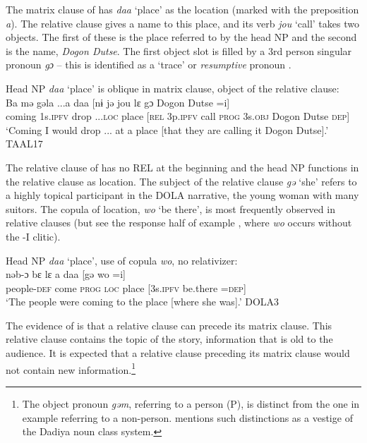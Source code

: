 \documentclass[output=paper]{langscibook}
\begin{document}
\noindent The matrix clause of  has \textit{daa} `place' as the location (marked with the preposition \textit{a}). The relative clause gives a name to this place, and its verb \textit{jou} `call' takes two objects. The first of these is the place referred to by the head NP and the second is the name, \textit{Dogon Dutse}. The first object slot is filled by a 3rd person singular pronoun \textit{gɔ} -- this is identified as a `trace' or \textit{resumptive} pronoun \citep[220]{Andrews2007}.

\ea Head NP \textit{daa} `place' is oblique in matrix clause, object of the relative clause:
\label{ex:dettweiler:TAAL17} \\
\gll Ba mə gəla ...a daa [nɨ jə jou lɛ gɔ Dogon Dutse =i] \\
coming 1s.\textsc{ipfv} drop ...\textsc{loc} place [\textsc{rel} 3p.\textsc{ipfv} call \textsc{prog} 3s.\textsc{obj} Dogon Dutse \textsc{dep}] \\
\glt `Coming I would drop ... at a place [that they are calling it Dogon Dutse].' TAAL17
\z

\noindent The relative clause of  has no REL at the beginning and the head NP functions in the relative clause as location. The subject of the relative clause \textit{gə} `she' refers to a highly topical participant in the DOLA narrative, the young woman with many suitors. The copula of location, \textit{wo} `be there', is most frequently observed in relative clauses (but see the response half of example , where \textit{wo} occurs without the -I clitic).\largerpage

\ea Head NP \textit{daa} `place', use of copula \textit{wo}, no relativizer:
\label{ex:dettweiler:DOLA3} \\
\gll nəb-ɔ bɛ lɛ a daa [gə wo =i] \\
people-\textsc{def} come \textsc{prog} \textsc{loc} place [3s.\textsc{ipfv} be.there =\textsc{dep}] \\
\glt `The people were coming to the place [where she was].' DOLA3
\z

\noindent The evidence of  is that a relative clause can precede its matrix clause. This relative clause contains the topic of the story, information that is old to the audience. It is expected that a relative clause preceding its matrix clause would not contain new information.\footnote{The object pronoun \textit{gəm}, referring to a person (P), is distinct from the one in example  referring to a non-person. \citet[195--196]{Jungraithmayr1968} mentions such distinctions as a vestige of the Dadiya noun class system.}
\end{document}
